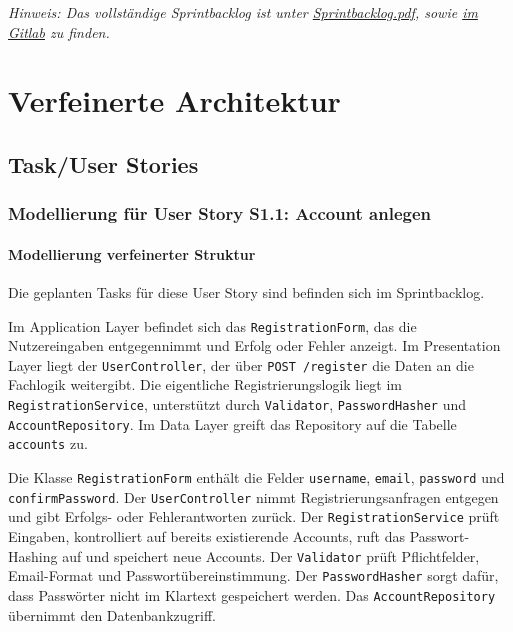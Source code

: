 \documentclass[a4paper,11pt]{article}
\begin{document}
\vspace{1em}
\noindent\textit{Hinweis: Das vollständige Sprintbacklog ist unter \href{run:./Sprintbacklog.pdf}{Sprintbacklog.pdf}, sowie \href{https://git.informatik.uni-rostock.de/softwaretechnik-ws-2025-26/uebung3/team3/projekt-team3-uebung3/-/blob/main/abgabedokumente/Sprintbacklog.pdf?ref_type=heads}{im Gitlab} zu finden.}

\section{Verfeinerte Architektur}

\subsection{Task/User Stories}
\subsubsection{Modellierung für User Story S1.1: Account anlegen}
\paragraph{Modellierung verfeinerter Struktur}

Die geplanten Tasks für diese User Story sind befinden sich im Sprintbacklog. 

Im Application Layer befindet sich das \texttt{RegistrationForm}, das die Nutzereingaben entgegennimmt und Erfolg oder Fehler anzeigt. Im Presentation Layer liegt der \texttt{UserController}, der über \texttt{POST /register} die Daten an die Fachlogik weitergibt. Die eigentliche Registrierungslogik liegt im \texttt{RegistrationService}, unterstützt durch \texttt{Validator}, \texttt{PasswordHasher} und \texttt{AccountRepository}. Im Data Layer greift das Repository auf die Tabelle \texttt{accounts} zu.

Die Klasse \texttt{RegistrationForm} enthält die Felder \texttt{username}, \texttt{email}, \texttt{password} und \texttt{confirmPassword}. Der \texttt{UserController} nimmt Registrierungsanfragen entgegen und gibt Erfolgs- oder Fehlerantworten zurück. Der \texttt{RegistrationService} prüft Eingaben, kontrolliert auf bereits existierende Accounts, ruft das Passwort-Hashing auf und speichert neue Accounts. Der \texttt{Validator} prüft Pflichtfelder, Email-Format und Passwortübereinstimmung. Der \texttt{PasswordHasher} sorgt dafür, dass Passwörter nicht im Klartext gespeichert werden. Das \texttt{AccountRepository} übernimmt den Datenbankzugriff.
\end{document}
